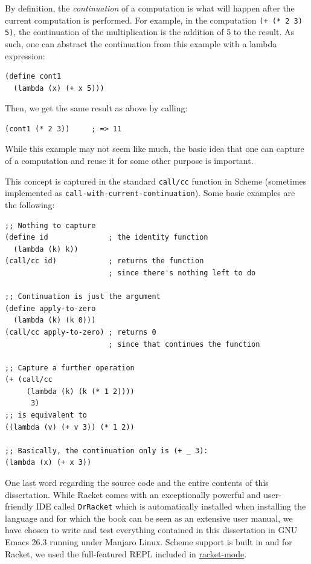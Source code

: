 By definition, the \emph{continuation} of a computation is what will happen
after the current computation is performed. For example, in the computation
\texttt{(+ (* 2 3) 5)}, the continuation of the multiplication is the addition
of 5 to the result. As such, one can abstract the continuation from this example
with a lambda expression:
\begin{verbatim}
(define cont1
  (lambda (x) (+ x 5)))
\end{verbatim}
Then, we get the same result as above by calling:
\begin{verbatim}
(cont1 (* 2 3))     ; => 11
\end{verbatim}
While this example may not seem like much, the basic idea that one can capture
 of a computation and reuse it for some other purpose is important.

This concept is captured in the standard \texttt{call/cc} function in Scheme
(sometimes implemented as \texttt{call-with-current-continuation}). Some basic
examples are the following:
\begin{verbatim}
;; Nothing to capture
(define id              ; the identity function
  (lambda (k) k))
(call/cc id)            ; returns the function
                        ; since there's nothing left to do

;; Continuation is just the argument
(define apply-to-zero
  (lambda (k) (k 0)))
(call/cc apply-to-zero) ; returns 0
                        ; since that continues the function

;; Capture a further operation
(+ (call/cc 
     (lambda (k) (k (* 1 2))))
      3)
;; is equivalent to
((lambda (v) (+ v 3)) (* 1 2))

;; Basically, the continuation only is (+ _ 3):
(lambda (x) (+ x 3))
\end{verbatim}


\vspace{0.3cm}

One last word regarding the source code and the entire contents of this
dissertation. While Racket comes with an exceptionally powerful and user-friendly
IDE called \texttt{DrRacket} which is automatically installed when installing
the language and for which the book \cite{htdp} can be seen as an extensive
user manual, we have chosen to write and test everything contained in this
dissertation in GNU Emacs 26.3 running under Manjaro Linux. Scheme support is
built in and for Racket, we used the full-featured REPL included in
\href{https://www.racket-mode.com/}{racket-mode}.


